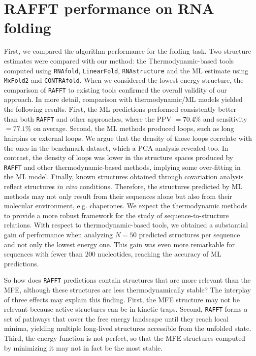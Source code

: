 \section{RAFFT performance on RNA folding}
First, we compared the algorithm performance for the folding task. Two structure estimates were compared with our method: the Thermodynamic-based tools computed using \texttt{RNAfold}, \texttt{LinearFold}, \texttt{RNAstructure} and the ML estimate using \texttt{MxFold2} and \texttt{CONTRAfold}. When we considered the lowest energy structure, the comparison of \texttt{RAFFT} to existing tools confirmed the overall validity of our approach. In more detail, comparison with thermodynamic/ML models yielded the following results. First, the ML predictions performed consistently better than both \texttt{RAFFT} and other approaches, where the PPV $=70.4\%$ and sensitivity $=77.1\%$ on average. Second, the ML methods produced loops, such as long hairpins or external loops. We argue that the density of those loops correlate with the ones in the benchmark dataset, which a PCA analysis revealed too. In contrast, the density of loops was lower in the structure spaces produced by \texttt{RAFFT} and other thermodynamic-based methods, implying some over-fitting in the ML model. Finally, known structures obtained through covariation analysis reflect structures \textit{in vivo} conditions. Therefore, the structures predicted by ML methods may not only result from their sequences alone but also from their molecular environment, e.g. chaperones. We expect the thermodynamic methods to provide a more robust framework for the study of sequence-to-structure relations.
With respect to thermodynamic-based tools, we obtained a substantial gain of performance when analyzing \(N=50\) predicted structures per sequence and not only the lowest energy one. This gain was even more remarkable for sequences with fewer than $200$ nucleotides, reaching the accuracy of ML predictions. 

So how does \texttt{RAFFT} predictions contain structures that are more relevant than the MFE, although these structures are less thermodynamically stable? The interplay of three effects may explain this finding. First, the MFE structure may not be relevant because active structures can be in kinetic traps. Second, \texttt{RAFFT} forms a set of pathways that cover the free energy landscape until they reach local minima, yielding multiple long-lived structures accessible from the unfolded state. Third, the energy function is not perfect, so that the MFE structures computed by minimizing it may not in fact be the most stable. 

